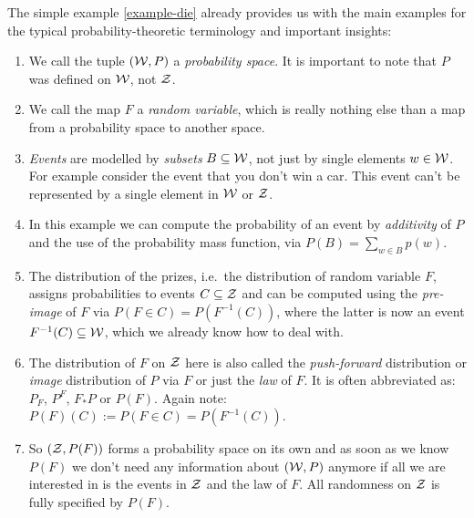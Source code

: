 \begin{Disc}%
    The simple example \ref{example-die} already provides us with the main examples for the typical 
    probability-theoretic terminology and important insights:
    \begin{enumerate}
        \item We call the tuple $(\mathcal{W},P)$ a \emph{probability space}. It is important to note that $P$ was defined on $\mathcal{W}$, not $\mathcal{Z}$.
        \item We call the map $F$ a \emph{random variable}, which is really nothing else than a map from a probability space to another space.
        \item \emph{Events} are modelled by \emph{subsets} $B \subseteq \mathcal{W}$, not just by single elements $w \in \mathcal{W}$. For example consider the event that you don't win a car. This event can't be represented by a single element in $\mathcal{W}$ or $\mathcal{Z}$.
        \item In this example we can compute the probability of an event by \emph{additivity} of $P$ and the use of the probability mass function,
            via $P(B) = \sum_{ w \in B} p(w)$.
        \item The distribution of the prizes, i.e.\ the distribution of random variable $F$, assigns 
               probabilities to events $C \subseteq \mathcal{Z}$ and can be computed using the \emph{pre-image} of $F$ 
               via $P(F \in C) = P(F^{-1}(C))$, where the latter is now an event $F^{-1}(C) \subseteq \mathcal{W}$, 
               which we already know how to deal with. 
           \item The distribution of $F$ on $\mathcal{Z}$ here is also called the \emph{push-forward} distribution or \emph{image} distribution 
            of $P$ via $F$ or just the \emph{law} of $F$. It is often abbreviated as: $P_F$, $P^F$, $F_*P$ or $P(F)$. 
            Again note: $P(F)(C) := P(F \in C)= P(F^{-1}(C))$.
        \item So $(\mathcal{Z},P(F))$ forms a probability space on its own and as soon as we know $P(F)$ we don't need any information about $(\mathcal{W},P)$ anymore if all we are interested in is the events in $\mathcal{Z}$ and the law of $F$. All randomness on $\mathcal{Z}$ is fully specified by $P(F)$.
    \end{enumerate}
\end{Disc}

